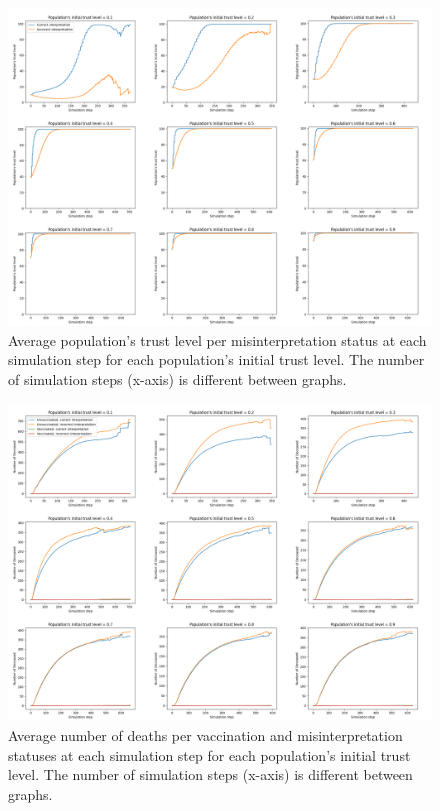 \begin{figure}[!htb]
    \centering
    \minipage{\textwidth}
        \includegraphics[width=1.3\linewidth, angle=90, origin=c]{pics/TM.png}
    \endminipage
    \caption{Average population's trust level per misinterpretation status at each simulation step for each population's initial trust level. The number of simulation steps (x-axis) is different between graphs.}
    \label{fig:tm_landscape}
\end{figure}

\newpage

\begin{figure}[!htb]
    \centering
    \minipage{\textwidth}
        \includegraphics[width=1.3\linewidth, angle=90, origin=c]{pics/DVM.png}
    \endminipage
    \caption{Average number of deaths per vaccination and misinterpretation statuses at each simulation step for each population's initial trust level. The number of simulation steps (x-axis) is different between graphs.}
    \label{fig:dvm_landscape}
\end{figure}

